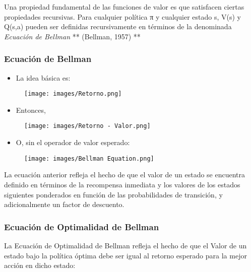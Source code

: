 \documentclass[11pt]{article}
\makeatletter
\def\maxwidth{\ifdim\Gin@nat@width>\linewidth\linewidth
    \else\Gin@nat@width\fi}
\let\Oldincludegraphics\includegraphics
\renewcommand{\includegraphics}[1]{\Oldincludegraphics[width=.8\maxwidth]{#1}}
\providecommand{\tightlist}{%
      \setlength{\itemsep}{0pt}\setlength{\parskip}{0pt}}
\makeatother
\begin{document}
Una propiedad fundamental de las funciones de valor es que satisfacen
ciertas propiedades recursivas. Para cualquier política π y cualquier
estado s, V(s) y Q(s,a) pueden ser definidas recursivamente en términos
de la denominada \emph{Ecuación de Bellman} ** (Bellman, 1957) **

    \subsubsection{Ecuación de Bellman}\label{ecuaciuxf3n-de-bellman}

\begin{itemize}
\tightlist
\item
  La idea básica es:
\end{itemize}

\begin{figure}
\centering
\texttt{[image: images/Retorno.png]}
\caption{}
\end{figure}

\begin{itemize}
\tightlist
\item
  Entonces,
\end{itemize}

\begin{figure}
\centering
\texttt{[image: images/Retorno - Valor.png]}
\caption{}
\end{figure}

\begin{itemize}
\tightlist
\item
  O, sin el operador de valor esperado:
\end{itemize}

\begin{figure}
\centering
\texttt{[image: images/Bellman Equation.png]}
\caption{}
\end{figure}

La ecuación anterior refleja el hecho de que el valor de un estado se
encuentra definido en términos de la recompensa inmediata y los valores
de los estados siguientes ponderados en función de las probabilidades de
transición, y adicionalmente un factor de descuento.

    \subsubsection{Ecuación de Optimalidad de
Bellman}\label{ecuaciuxf3n-de-optimalidad-de-bellman}

La Ecuación de Optimalidad de Bellman refleja el hecho de que el Valor
de un estado bajo la política óptima debe ser igual al retorno esperado
para la mejor acción en dicho estado:
\end{document}
